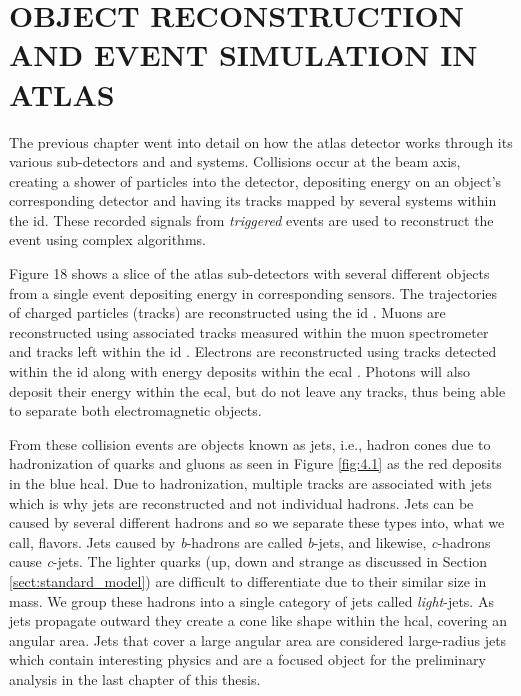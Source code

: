 \begingroup
\clearpage%
\let\clearpage\relax%
\vspace*{-16pt}%
\chapter[OBJECT RECONSTRUCTION AND EVENT SIMULATION IN ATLAS]{OBJECT RECONSTRUCTION AND EVENT SIMULATION IN ATLAS}
\label{ch4}
\endgroup

The previous chapter went into detail on how the \gls{atlas} detector works through its various sub-detectors and and systems. Collisions occur at the beam axis, creating a shower 
of particles into the detector, depositing energy on an object's corresponding detector and having its tracks mapped by several systems within the \gls{id}. These recorded signals 
from \textit{triggered} events are used to reconstruct the event using complex algorithms. 
\par
Figure 18 shows a slice of the \gls{atlas} sub-detectors with several different objects from a single event depositing energy in corresponding sensors. The trajectories 
of charged particles (tracks) are reconstructed using the \gls{id} \cite{atlas}. Muons are reconstructed using associated tracks measured within the muon spectrometer and 
tracks left within the \gls{id} \cite{muon-reco}. Electrons are reconstructed using tracks detected within the \gls{id} along with energy deposits within the \gls{ecal} \cite{e-y_performance}.
Photons will also deposit their energy within the \gls{ecal}, but do not leave any tracks, thus being able to separate both electromagnetic objects. 
\par
From these collision events are objects known as jets, i.e., hadron cones due to hadronization of quarks and gluons as seen in Figure \ref{fig:4.1} as the red deposits in the blue \gls{hcal}.
Due to hadronization, multiple tracks are associated with jets which is why jets are reconstructed and not individual hadrons. Jets can be caused by several different hadrons 
and so we separate these types into, what we call, flavors. Jets caused by \textit{b}-hadrons are called \textit{b}-jets, and likewise, \textit{c}-hadrons cause \textit{c}-jets. 
The lighter quarks (up, down and strange as discussed in Section \ref{sect:standard_model}) are difficult to differentiate due to their similar size in mass. We group these hadrons 
into a single category of jets called \textit{light}-jets. As jets propagate outward they create a cone like shape within the \gls{hcal}, covering an angular 
area. Jets that cover a large angular area are considered large-radius jets \cite{large-r-jets} which contain interesting physics and are a focused object for the preliminary 
analysis in the last chapter of this thesis. 

